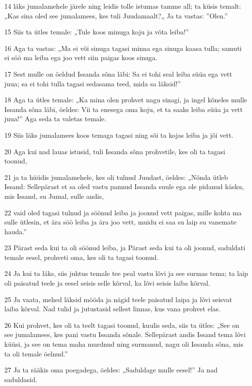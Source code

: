 \par 14 läks jumalamehele järele ning leidis tolle istumas tamme all; ta küsis temalt: „Kas sina oled see jumalamees, kes tuli Juudamaalt?„ Ja ta vastas: ”Olen.”
\par 15 Siis ta ütles temale: „Tule koos minuga koju ja võta leiba!”
\par 16 Aga ta vastas: „Ma ei või sinuga tagasi minna ega sinuga kaasa tulla; samuti ei söö ma leiba ega joo vett siin paigas koos sinuga.
\par 17 Sest mulle on öeldud Issanda sõna läbi: Sa ei tohi seal leiba süüa ega vett juua; sa ei tohi tulla tagasi sedasama teed, mida sa läksid!”
\par 18 Aga ta ütles temale: „Ka mina olen prohvet nagu sinagi, ja ingel kõneles mulle Issanda sõna läbi, öeldes: Vii ta enesega oma koju, et ta saaks leiba süüa ja vett juua!” Aga seda ta valetas temale.
\par 19 Siis läks jumalamees koos temaga tagasi ning sõi ta kojas leiba ja jõi vett.
\par 20 Aga kui nad lauas istusid, tuli Issanda sõna prohvetile, kes oli ta tagasi toonud,
\par 21 ja ta hüüdis jumalamehele, kes oli tulnud Juudast, öeldes: „Nõnda ütleb Issand: Sellepärast et sa oled vastu pannud Issanda suule ega ole pidanud käsku, mis Issand, su Jumal, sulle andis,
\par 22 vaid oled tagasi tulnud ja söönud leiba ja joonud vett paigas, mille kohta ma sulle ütlesin, et ära söö leiba ja ära joo vett, muidu ei saa su laip su vanemate hauda.”
\par 23 Pärast seda kui ta oli söönud leiba, ja Pärast seda kui ta oli joonud, saduldati temale eesel, prohveti oma, kes oli ta tagasi toonud.
\par 24 Ja kui ta läks, siis juhtus temale tee peal vastu lõvi ja see surmas tema; ta laip oli paisatud teele ja eesel seisis selle kõrval, ka lõvi seisis laiba kõrval.
\par 25 Ja vaata, mehed läksid mööda ja nägid teele paisatud laipa ja lõvi seisvat laiba kõrval. Nad tulid ja jutustasid sellest linnas, kus vana prohvet elas.
\par 26 Kui prohvet, kes oli ta teelt tagasi toonud, kuulis seda, siis ta ütles: „See on see jumalamees, kes pani vastu Issanda sõnale. Sellepärast andis Issand tema lõvi küüsi, ja see on tema maha murdnud ning surmanud, nagu oli Issanda sõna, mis ta oli temale öelnud.”
\par 27 Ja ta rääkis oma poegadega, öeldes: „Saduldage mulle eesel!” Ja nad saduldasid.
